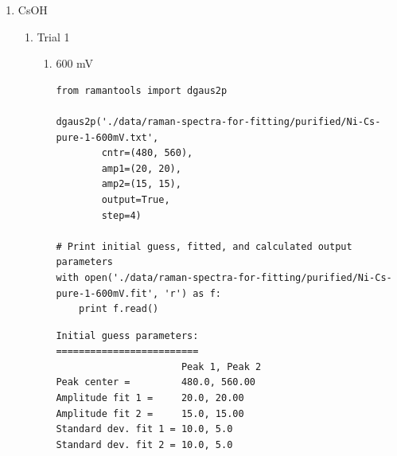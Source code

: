 \documentclass[journal=jpccck,manuscript=suppinfo,email=true]{achemso}
\begin{document}
\begin{enumerate}
\begin{enumerate}
\begin{enumerate}
\begin{verbatim}
# Print initial guess, fitted, and calculated output parameters
with open('./data/raman-spectra-for-fitting/purified/Ni-Li-pure-3-800mV.fit', 'r') as f:
    print f.read()
\end{verbatim}

\begin{verbatim}
Initial guess parameters:
=========================
                      Peak 1, Peak 2
Peak center =         480.0, 560.00
Amplitude fit 1 =     20.0, 20.00
Amplitude fit 2 =     15.0, 15.00
Standard dev. fit 1 = 10.0, 5.0
Standard dev. fit 2 = 10.0, 5.0

Baseline parameters:
=========================
Slope =               -0.01
Intercept =           18.86

Fitted parameters:
=========================
                      Peak 1, Peak 2
Peak center =         481.70, 561.30
Amplitude fit 1 =     6.45, 36.69
Amplitude fit 2 =     12.66, 14.57
Standard dev. fit 1 = 33.81, 9.49
Standard dev. fit 2 = 30.84, 6.88

Calculation output:
========================
Mean peak 1 =         481.7 $\pm$ 0.16
Mean peak 2 =         561.3 $\pm$ 0.31
Height peak 1 =       55.5 $\pm$ 0.43
Height peak 2 =       38.5 $\pm$ 0.48
Area peak 1 =         2006.8
Area peak 2 =         1738.6
\end{verbatim}
\end{enumerate}
\end{enumerate}

\item CsOH
\label{sec-4-1-0-2}
\begin{enumerate}
\item Trial 1
\label{sec-4-1-0-2-1}
\begin{enumerate}
\item 600 mV
\label{sec-4-1-0-2-1-1}
\begin{verbatim}
from ramantools import dgaus2p

dgaus2p('./data/raman-spectra-for-fitting/purified/Ni-Cs-pure-1-600mV.txt',
        cntr=(480, 560),
        amp1=(20, 20),
        amp2=(15, 15),
        output=True,
        step=4)

# Print initial guess, fitted, and calculated output parameters
with open('./data/raman-spectra-for-fitting/purified/Ni-Cs-pure-1-600mV.fit', 'r') as f:
    print f.read()
\end{verbatim}

\begin{verbatim}
Initial guess parameters:
=========================
                      Peak 1, Peak 2
Peak center =         480.0, 560.00
Amplitude fit 1 =     20.0, 20.00
Amplitude fit 2 =     15.0, 15.00
Standard dev. fit 1 = 10.0, 5.0
Standard dev. fit 2 = 10.0, 5.0


\end{verbatim}
\end{enumerate}
\end{enumerate}
\end{enumerate}
\end{document}
